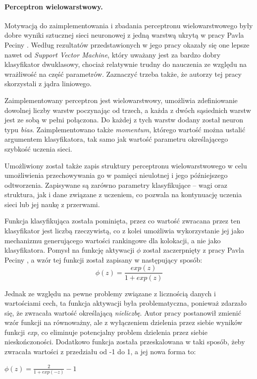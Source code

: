 \documentclass[11pt,a4paper]{llncs}
\begin{document}
\paragraph{Perceptron wielowarstwowy.}
Motywacją do zaimplementowania i zbadania perceptronu wielowarstwowego były dobre wyniki sztucznej sieci neuronowej z jedną warstwą ukrytą w pracy Pavla Peciny \cite{coling}.
Według rezultatów przedstawionych w jego pracy okazały się one lepsze nawet od \emph{Support Vector Machine}, który uważany jest za bardzo dobry klasyfikator dwuklasowy, chociaż relatywnie trudny do nauczenia ze względu na wrażliwość na część parametrów.
Zaznaczyć trzeba także, że autorzy tej pracy skorzystali z jądra liniowego.

\par
Zaimplementowany perceptron jest wielowarstwowy, umożliwia zdefiniowanie dowolnej liczby warstw poczynając od trzech, a każda z dwóch sąsiednich warstw jest ze sobą w pełni połączona.
Do każdej z tych warstw dodany został neuron typu \emph{bias}. 
Zaimplementowano także \emph{momentum}, którego wartość można ustalić argumentem klasyfikatora, tak samo jak wartość parametru określającego szybkość uczenia sieci.
\par
Umożliwiony został także zapis struktury perceptronu wielowarstwowego w celu umożliwienia przechowywania go w pamięci nieulotnej i jego późniejszego odtworzenia.
Zapisywane są zarówno parametry klasyfikujące -- wagi oraz struktura, jak i dane związane z uczeniem, co pozwala na kontynuację uczenia sieci lub jej naukę z przerwami.

\par
Funkcja klasyfikująca została pominięta, przez co wartość zwracana przez ten klasyfikator jest liczbą rzeczywistą, co z kolei umożliwia wykorzystanie jej jako mechanizmu generującego wartości rankingowe dla kolokacji, a nie jako klasyfikatora.
Pomysł na funkcję aktywacji \( \phi \) został zaczerpnięty z pracy Pavla Peciny \cite{coling}, a wzór tej funkcji został zapisany w następujący sposób:
$$ \phi(z) = \frac{exp(z)}{1 + exp(z)} $$

Jednak ze względu na pewne problemy związane z licznością danych i wartościami cech, ta funkcja aktywacji była problematyczna, ponieważ zdarzało się, że zwracała wartość określającą \emph{nieliczbę}.
Autor pracy postanowił zmienić wzór funkcji na równoważny, ale z wyłączeniem dzielenia przez siebie wyników funkcji \emph{exp}, co eliminuje potencjalny problem dzielenia przez siebie nieskończoności.
Dodatkowo funkcja została przeskalowana w taki sposób, żeby zwracała wartości z przedziału od -1 do 1, a jej nowa forma to:
\begin{center}
\( \phi(z) = \frac{2}{1 + exp(-z)} - 1 \)
\end{center}
\end{document}
